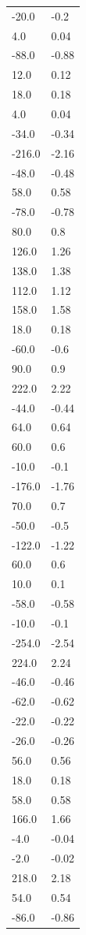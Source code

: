 \begin{longtable}{ll}
-20.0 & -0.2 \\
4.0 & 0.04 \\
-88.0 & -0.88 \\
12.0 & 0.12 \\
18.0 & 0.18 \\
4.0 & 0.04 \\
-34.0 & -0.34 \\
-216.0 & -2.16 \\
-48.0 & -0.48 \\
58.0 & 0.58 \\
-78.0 & -0.78 \\
80.0 & 0.8 \\
126.0 & 1.26 \\
138.0 & 1.38 \\
112.0 & 1.12 \\
158.0 & 1.58 \\
18.0 & 0.18 \\
-60.0 & -0.6 \\
90.0 & 0.9 \\
222.0 & 2.22 \\
-44.0 & -0.44 \\
64.0 & 0.64 \\
60.0 & 0.6 \\
-10.0 & -0.1 \\
-176.0 & -1.76 \\
70.0 & 0.7 \\
-50.0 & -0.5 \\
-122.0 & -1.22 \\
60.0 & 0.6 \\
10.0 & 0.1 \\
-58.0 & -0.58 \\
-10.0 & -0.1 \\
-254.0 & -2.54 \\
224.0 & 2.24 \\
-46.0 & -0.46 \\
-62.0 & -0.62 \\
-22.0 & -0.22 \\
-26.0 & -0.26 \\
56.0 & 0.56 \\
18.0 & 0.18 \\
58.0 & 0.58 \\
166.0 & 1.66 \\
-4.0 & -0.04 \\
-2.0 & -0.02 \\
218.0 & 2.18 \\
54.0 & 0.54 \\
-86.0 & -0.86 \\

\end{longtable}
